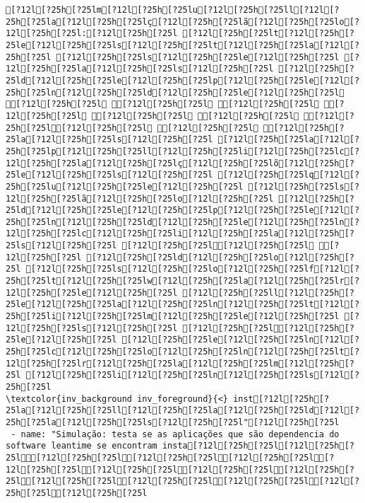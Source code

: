 \documentclass{scrartcl}
\begin{document}
\begin{Verbatim}
[?12l[?25h[?25lm[?12l[?25h[?25lu[?12l[?25h[?25ll[?12l[?25h[?25la[?12l[?25h[?25lç[?12l[?25h[?25lã[?12l[?25h[?25lo[?12l[?25h[?25l:[?12l[?25h[?25l [?12l[?25h[?25lt[?12l[?25h[?25le[?12l[?25h[?25ls[?12l[?25h[?25lt[?12l[?25h[?25la[?12l[?25h[?25l [?12l[?25h[?25ls[?12l[?25h[?25le[?12l[?25h[?25l [?12l[?25h[?25la[?12l[?25h[?25ls[?12l[?25h[?25l [?12l[?25h[?25ld[?12l[?25h[?25le[?12l[?25h[?25lp[?12l[?25h[?25le[?12l[?25h[?25ln[?12l[?25h[?25ld[?12l[?25h[?25le[?12l[?25h[?25l [?12l[?25h[?25l [?12l[?25h[?25l [?12l[?25h[?25l [?12l[?25h[?25l [?12l[?25h[?25l [?12l[?25h[?25l [?12l[?25h[?25l[?12l[?25h[?25l [?12l[?25h[?25l [?12l[?25h[?25la[?12l[?25h[?25ls[?12l[?25h[?25l [?12l[?25h[?25la[?12l[?25h[?25lp[?12l[?25h[?25ll[?12l[?25h[?25li[?12l[?25h[?25lc[?12l[?25h[?25la[?12l[?25h[?25lç[?12l[?25h[?25lõ[?12l[?25h[?25le[?12l[?25h[?25ls[?12l[?25h[?25l [?12l[?25h[?25lq[?12l[?25h[?25lu[?12l[?25h[?25le[?12l[?25h[?25l [?12l[?25h[?25ls[?12l[?25h[?25lã[?12l[?25h[?25lo[?12l[?25h[?25l [?12l[?25h[?25ld[?12l[?25h[?25le[?12l[?25h[?25lp[?12l[?25h[?25le[?12l[?25h[?25ln[?12l[?25h[?25ld[?12l[?25h[?25le[?12l[?25h[?25ln[?12l[?25h[?25lc[?12l[?25h[?25li[?12l[?25h[?25la[?12l[?25h[?25ls[?12l[?25h[?25l [?12l[?25h[?25l[?12l[?25h[?25l [?12l[?25h[?25l [?12l[?25h[?25ld[?12l[?25h[?25lo[?12l[?25h[?25l [?12l[?25h[?25ls[?12l[?25h[?25lo[?12l[?25h[?25lf[?12l[?25h[?25lt[?12l[?25h[?25lw[?12l[?25h[?25la[?12l[?25h[?25lr[?12l[?25h[?25le[?12l[?25h[?25l [?12l[?25h[?25ll[?12l[?25h[?25le[?12l[?25h[?25la[?12l[?25h[?25ln[?12l[?25h[?25lt[?12l[?25h[?25li[?12l[?25h[?25lm[?12l[?25h[?25le[?12l[?25h[?25l [?12l[?25h[?25ls[?12l[?25h[?25l [?12l[?25h[?25l[?12l[?25h[?25le[?12l[?25h[?25l [?12l[?25h[?25le[?12l[?25h[?25ln[?12l[?25h[?25lc[?12l[?25h[?25lo[?12l[?25h[?25ln[?12l[?25h[?25lt[?12l[?25h[?25lr[?12l[?25h[?25la[?12l[?25h[?25lm[?12l[?25h[?25l [?12l[?25h[?25li[?12l[?25h[?25ln[?12l[?25h[?25ls[?12l[?25h[?25l
\textcolor{inv_background inv_foreground}{<} inst[?12l[?25h[?25la[?12l[?25h[?25ll[?12l[?25h[?25la[?12l[?25h[?25ld[?12l[?25h[?25la[?12l[?25h[?25ls[?12l[?25h[?25l"[?12l[?25h[?25l
 - name: "Simulação: testa se as aplicações que são dependencia do software leantime se encontram insta[?12l[?25h[?25l[?12l[?25h[?25l[?12l[?25h[?25l[?12l[?25h[?25l[?12l[?25h[?25l[?12l[?25h[?25l[?12l[?25h[?25l[?12l[?25h[?25l[?12l[?25h[?25l[?12l[?25h[?25l[?12l[?25h[?25l[?12l[?25h[?25l[?12l[?25h[?25l[?12l[?25h[?25l

\end{Verbatim}
\end{document}
